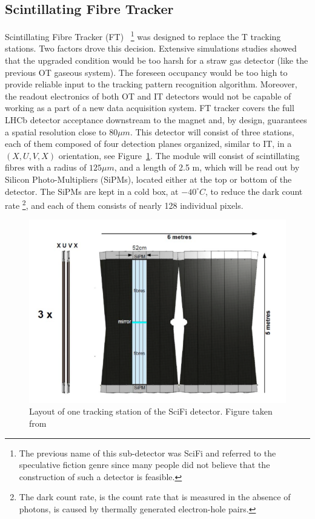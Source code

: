 \subsection{Scintillating Fibre Tracker}

Scintillating Fibre Tracker (FT)~\cite{upgrade_tracker_tdr} \footnote{The previous name of this sub-detector was SciFi and referred to the speculative fiction genre since many people did not believe that the construction of such a detector is feasible.} was designed to replace the T tracking stations. Two factors drove this decision. Extensive simulations studies showed that the upgraded condition would be too harsh for a straw gas detector (like the previous OT gaseous system). The foreseen occupancy would be too high to provide reliable input to the tracking pattern recognition algorithm. Moreover, the readout electronics of both OT and IT detectors would not be capable of working as a part of a new data acquisition system. FT tracker covers the full LHCb detector acceptance downstream to the magnet and, by design, guarantees a spatial resolution close to $80 \mu m$. 
This detector will consist of three stations, each of them composed of four detection planes organized, similar to IT,  in a $(X, U, V, X)$ orientation, see Figure~\ref{fig:SciFI}.
 The module will consist of scintillating fibres with a radius of  $125 \mu m$, and a length of 2.5 m, which will be read out by Silicon Photo-Multipliers (SiPMs), located either at the top or bottom of the detector. The SiPMs are kept in a cold box, at $-40^{\circ} C$, to reduce the dark count rate \footnote{The dark count rate, is the count rate that is measured in the absence of photons, is caused by thermally generated electron-hole pairs.}, and each of them consists of nearly 128 individual pixels.   


\begin{figure}[!h]
\centering
\includegraphics[scale=0.6]{figures/SciFi.PNG}
\caption{Layout of one tracking station of the SciFi detector. Figure taken from~\cite{upgrade_tracker_tdr}
\label{fig:SciFI}}
\end{figure}

